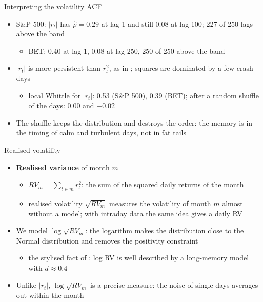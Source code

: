 \begin{frame}{Interpreting the volatility ACF}
\itemsize{\small}
\begin{itemize}
    \item S\&P 500: $|r_t|$ has $\hat\rho = 0.29$ at lag 1 and still 0.08 at lag 100; 227 of 250 lags above the band
    \begin{itemize}
        \item BET: 0.40 at lag 1, 0.08 at lag 250, 250 of 250 above the band
    \end{itemize}
    \item $|r_t|$ is more persistent than $r_t^2$, as in ; squares are dominated by a few crash days
    \begin{itemize}
        \item local Whittle for $|r_t|$: 0.53 (S\&P 500), 0.39 (BET); after a random shuffle of the days: 0.00 and $-$0.02
    \end{itemize}
    \item The shuffle keeps the distribution and destroys the order: the memory is in the timing of calm and turbulent days, not in fat tails
\end{itemize}
\end{frame}

\begin{frame}{Realised volatility}
\itemsize{\small}
\begin{itemize}
    \item \textbf{Realised variance} of month $m$ 
    \begin{itemize}
        \item $RV_m = \sum_{t \in m} r_t^2$: the sum of the squared daily returns of the month
        \item realised volatility $\sqrt{RV_m}$ measures the volatility of month $m$ almost without a model; with intraday data the same idea gives a daily RV
    \end{itemize}
    \item We model $\log\sqrt{RV_m}$: the logarithm makes the distribution close to the Normal distribution and removes the positivity constraint
    \begin{itemize}
        \item the stylised fact of : log RV is well described by a long-memory model with $d \approx 0.4$
    \end{itemize}
    \item Unlike $|r_t|$, $\log\sqrt{RV_m}$ is a precise measure: the noise of single days averages out within the month
\end{itemize}
\end{frame}

